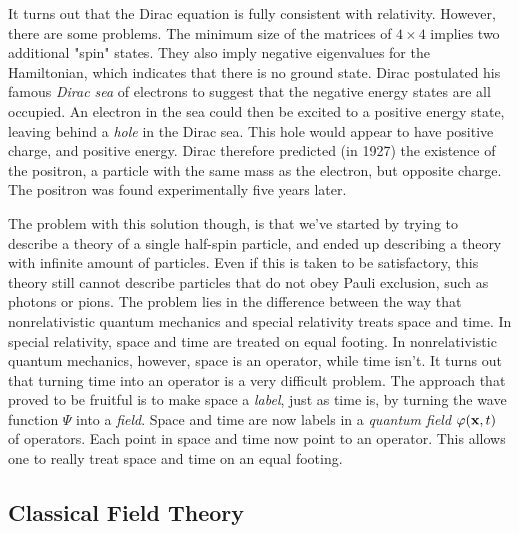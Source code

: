 It turns out that the Dirac equation is fully consistent with relativity. However, there are some problems. The minimum size of the matrices of $4\times 4$ implies two additional "spin" states. They also imply negative eigenvalues for the Hamiltonian, which indicates that there is no ground state. Dirac postulated his famous \emph{Dirac sea} of electrons to suggest that the negative energy states are all occupied. An electron in the sea could then be excited to a positive energy state, leaving behind a \emph{hole} in the Dirac sea. This hole would appear to have positive charge, and positive energy. Dirac therefore predicted (in 1927) the existence of the positron, a particle with the same mass as the electron, but opposite charge. The positron was found experimentally five years later.

The problem with this solution though, is that we've started by trying to describe a theory of a single half-spin particle, and ended up describing a theory with infinite amount of particles. Even if this is taken to be satisfactory, this theory still cannot describe particles that do not obey Pauli exclusion, such as photons or pions. The problem lies in the difference between the way that nonrelativistic quantum mechanics and special relativity treats space and time. In special relativity, space and time are treated on equal footing. In nonrelativistic quantum mechanics, however, space is an operator, while time isn't. It turns out that turning time into an operator is a very difficult problem. The approach that proved to be fruitful is to make space a \emph{label}, just as time is, by turning the wave function $\Psi$ into a \emph{field}. Space and time are now labels in a \emph{quantum field} $\varphi(\vb{x},t)$ of operators. Each point in space and time now point to an operator. This allows one to really treat space and time on an equal footing.

\subsection{Classical Field Theory}
\label{sec:classical-field}

